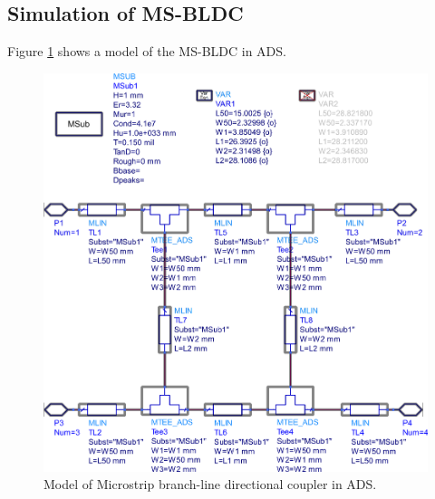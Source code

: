 \subsection{Simulation of MS-BLDC}

Figure \ref{fig:msbldc-model} shows a model of the MS-BLDC in ADS.

\begin{figure}[h t b p]
	\centering
	\includegraphics[width=\textwidth,keepaspectratio]{figures/msbldc-model.eps}
	\caption{Model of Microstrip branch-line directional coupler in ADS.}
	\label{fig:msbldc-model}
\end{figure}